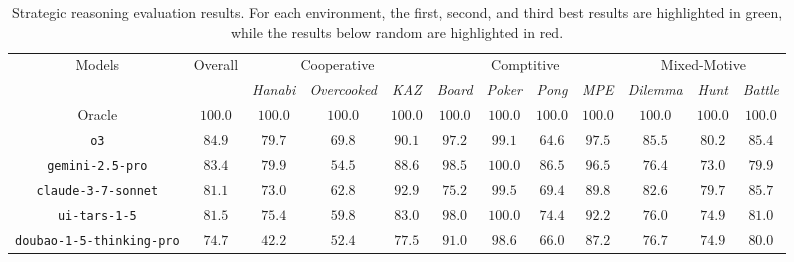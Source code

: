 \newcommand{\cmark}{\textcolor{LimeGreen}{\ding{51}}}
\newcommand{\xmark}{\textcolor{red}{\ding{55}}}
\newcommand{\onestar}{\ding{73}}
\newcommand{\twostar}{\ding{73}\ding{73}}
\newcommand{\threestar}{\ding{73}\ding{73}\ding{73}}

\begin{table}[t]
\centering
\caption{Strategic reasoning evaluation results. For each environment, the \colorbox{first}{first}, \colorbox{second}{second}, and \colorbox{third}{third} best results are highlighted in green, while the results \colorbox{below}{below random} are highlighted in red.}
\label{tab:reasoning}
\scriptsize
\setlength{\tabcolsep}{6.5pt}
\begin{tabular}{cccccccccccc}
\toprule
\multirow{2}{*}{Models\footnotemark}
& \multirow{2}{*}{Overall} & \multicolumn{3}{c}{Cooperative} & \multicolumn{4}{c}{Comptitive} & \multicolumn{3}{c}{Mixed-Motive} \\
& & \textit{Hanabi} & \textit{Overcooked} & \textit{KAZ} & \textit{Board}
& \textit{Poker}    & \textit{Pong} & \textit{MPE} & \textit{Dilemma} & \textit{Hunt} & \textit{Battle} \\
\midrule
Oracle & $100.0$ & $100.0$ & $100.0$ & $100.0$ & $100.0$ & $100.0$ & $100.0$ & $100.0$ & $100.0$ & $100.0$ & $100.0$ \\
\midrule
\texttt{o3} & \cellcolor{first} $84.9$ & $79.7$ & \cellcolor{second} $69.8$ & \cellcolor{third} $90.1$ & \cellcolor{third} $97.2$ & $99.1$ & $64.6$ & \cellcolor{second} $97.5$ & \cellcolor{second} $85.5$ & \cellcolor{third} $80.2$ & \cellcolor{third} $85.4$ \\
\texttt{gemini-2.5-pro} & \cellcolor{third} $83.4$ & \cellcolor{second} $79.9$ & $54.5$ & $88.6$ & \cellcolor{first} $98.5$ & \cellcolor{first} $100.0$ & \cellcolor{first} $86.5$ & $96.5$ & $76.4$ & $73.0$ & $79.9$ \\
\texttt{claude-3-7-sonnet} & $81.1$ & $73.0$ & $62.8$ & \cellcolor{first} $92.9$ & $75.2$ & $99.5$ & $69.4$ & $89.8$ & \cellcolor{third} $82.6$ & $79.7$ & \cellcolor{second} $85.7$ \\
\texttt{ui-tars-1-5} & $81.5$ & $75.4$ & $59.8$ & $83.0$ & \cellcolor{second} $98.0$ & \cellcolor{first} $100.0$ & $74.4$ & $92.2$ & $76.0$ & $74.9$ & $81.0$ \\
\texttt{doubao-1-5-thinking-pro} & $74.7$ & $42.2$ & $52.4$ & $77.5$ & $91.0$ & $98.6$ & $66.0$ & $87.2$ & $76.7$ & $74.9$ & $80.0$ \\

\end{tabular}
\end{table}
